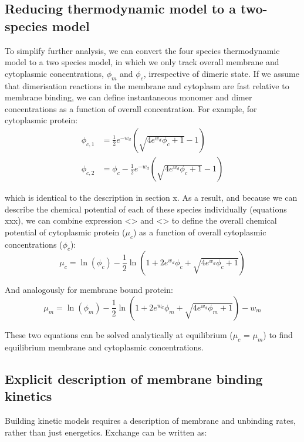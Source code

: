 \documentclass[12pt]{"report"}
\begin{document}
\subsection{Reducing thermodynamic model to a two-species model} 

To simplify further analysis, we can convert the four species thermodynamic model to a two species model, in which we only track overall membrane and cytoplasmic concentrations, $\phi_m$ and $\phi_c$, irrespective of dimeric state. If we assume that dimerisation reactions in the membrane and cytoplasm are fast relative to membrane binding, we can define instantaneous monomer and dimer concentrations as a function of overall concentration. For example, for cytoplasmic protein:
\begin{align}
\phi_{c,1} &= \frac{1}{2}e^{-w_d}\left(\sqrt{4e^{w_d}\phi_c + 1} - 1\right)\\
\phi_{c,2} &= \phi_c - \frac{1}{2}e^{-w_d}\left(\sqrt{4e^{w_d}\phi_c + 1} - 1\right)
\end{align}

which is identical to the description in section x. As a result, and because we can describe the chemical potential of each of these species individually (equations xxx), we can combine expression <> and <> to define the overall chemical potential of cytoplasmic protein ($\mu_c$) as a function of overall cytoplasmic concentrations ($\phi_c$):
\begin{equation}
\mu_c = \ln(\phi_c) - \frac{1}{2}\ln\left(1 + 2e^{w_d}\phi_c + \sqrt{4e^{w_d}\phi_c + 1}\right)
\end{equation}

And analogously for membrane bound protein: 
\begin{equation}
\mu_m = \ln(\phi_m) - \frac{1}{2}\ln\left(1 + 2e^{w_d}\phi_m + \sqrt{4e^{w_d}\phi_m + 1}\right) - w_m
\end{equation}

These two equations can be solved analytically at equilibrium ($\mu_c$ = $\mu_m$) to find equilibrium membrane and cytoplasmic concentrations.


\subsection{Explicit description of membrane binding kinetics} 

Building kinetic models requires a description of membrane and unbinding rates, rather than just energetics. Exchange can be written as:
\end{document}
